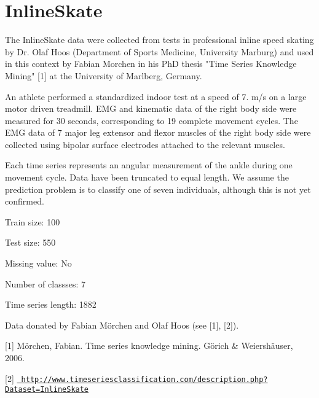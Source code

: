 \chapter{Inline\+Skate}
\hypertarget{md_external_2data_2UCRArchive__2018_2InlineSkate_2README}{}\label{md_external_2data_2UCRArchive__2018_2InlineSkate_2README}
\label{md_external_2data_2UCRArchive__2018_2InlineSkate_2README_autotoc_md124}%
%
 The Inline\+Skate data were collected from tests in professional inline speed skating by Dr. Olaf Hoos (Department of Sports Medicine, University Marburg) and used in this context by Fabian Morchen in his PhD thesis "{}\+Time Series Knowledge Mining"{} \mbox{[}1\mbox{]} at the University of Marlberg, Germany.

An athlete performed a standardized indoor test at a speed of 7. m/s on a large motor driven treadmill. EMG and kinematic data of the right body side were measured for 30 seconds, corresponding to 19 complete movement cycles. The EMG data of 7 major leg extensor and flexor muscles of the right body side were collected using bipolar surface electrodes attached to the relevant muscles.

Each time series represents an angular measurement of the ankle during one movement cycle. Data have been truncated to equal length. We assume the prediction problem is to classify one of seven individuals, although this is not yet confirmed.

Train size\+: 100

Test size\+: 550

Missing value\+: No

Number of classses\+: 7

Time series length\+: 1882

Data donated by Fabian Mörchen and Olaf Hoos (see \mbox{[}1\mbox{]}, \mbox{[}2\mbox{]}).

\mbox{[}1\mbox{]} Mörchen, Fabian. Time series knowledge mining. Görich \& Weiershäuser, 2006.

\mbox{[}2\mbox{]} \href{http://www.timeseriesclassification.com/description.php?Dataset=InlineSkate}{\texttt{ http\+://www.\+timeseriesclassification.\+com/description.\+php?\+Dataset=\+Inline\+Skate}} 
